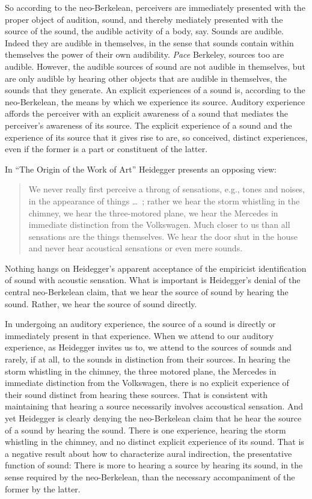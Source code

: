 So according to the neo-Berkelean, perceivers are immediately presented with the proper object of audition, sound, and thereby mediately presented with the source of the sound, the audible activity of a body, say. Sounds are audible. Indeed they are audible in themselves, in the sense that sounds contain within themselves the power of their own audibility. \emph{Pace} Berkeley, sources too are audible. However, the audible sources of sound are not audible in themselves, but are only audible by hearing other objects that are audible in themselves, the sounds that they generate. An explicit experiences of a sound is, according to the neo-Berkelean, the means by which we experience its source.  Auditory experience affords the perceiver with an explicit awareness of a sound that mediates the perceiver's awareness of its source. The explicit experience of a sound and the experience of its source that it gives rise to are, so conceived, distinct experiences, even if the former is a part or constituent of the latter.

In ``The Origin of the Work of Art'' Heidegger presents an opposing view:
\begin{quote}
    We never really first perceive a throng of sensations, e.g., tones and noises, in the appearance of things \ldots\ ; rather we hear the storm whistling in the chimney, we hear the three-motored plane, we hear the Mercedes in immediate distinction from the Volkswagen. Much closer to us than all sensations are the things themselves. We hear the door shut in the house and never hear acoustical sensations or even mere sounds. \citep[151--152]{Heidegger:1935uq}
\end{quote}
Nothing hangs on Heidegger's apparent acceptance of the empiricist identification of sound with acoustic sensation. What is important is Heidegger's denial of the central neo-Berkelean claim, that we hear the source of sound by hearing the sound. Rather, we hear the source of sound directly.

In undergoing an auditory experience, the source of a sound is directly or immediately present in that experience. When we attend to our auditory experience, as Heidegger invites us to, we attend to the sources of sounds and rarely, if at all, to the sounds in distinction from their sources. In hearing the storm whistling in the chimney, the three motored plane, the Mercedes in immediate distinction from the Volkswagen, there is no explicit experience of their sound distinct from hearing these sources. That is consistent with maintaining that hearing a source necessarily involves accoustical sensation. And yet Heidegger is clearly denying the neo-Berkelean claim that he hear the source of a sound by hearing the sound. There is one experience, hearing the storm whistling in the chimney, and no distinct explicit experience of its sound. That is a negative result about how to characterize aural indirection, the presentative function of sound: There is more to hearing a source by hearing its sound, in the sense required by the neo-Berkelean, than the necessary accompaniment of the former by the latter.

